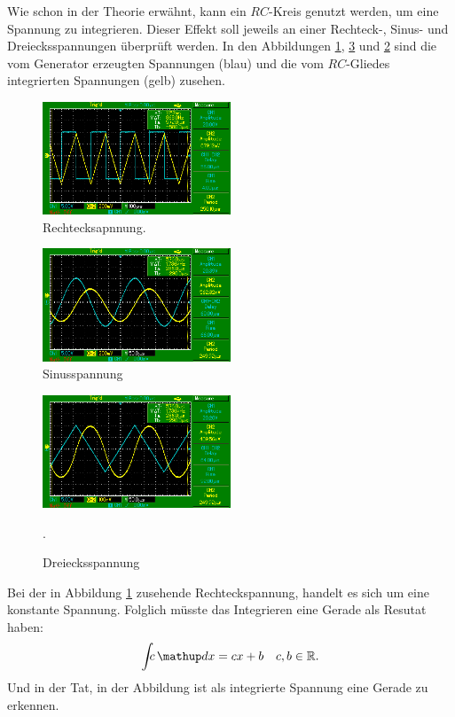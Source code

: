 Wie schon in der Theorie erwähnt, kann ein $RC$-Kreis genutzt werden, um eine
Spannung zu integrieren.
Dieser Effekt soll jeweils an einer Rechteck-, Sinus- und Dreiecksspannungen %
überprüft werden.
In den Abbildungen \ref{fig:rechteck}, \ref{fig:dreieck} und \ref{fig:sinus} sind die vom
Generator erzeugten Spannungen (blau) und die vom $RC$-Gliedes integrierten Spannungen
(gelb) zusehen. %
\FloatBarrier
\begin{figure}
  \centering
  \includegraphics[width=0.5\textwidth]{pics/teild_rechteckspannung.png}
  \caption{Rechtecksapnnung.}
  \label{fig:rechteck}
\end{figure}
\begin{figure}
  \centering
  \includegraphics[width=0.5\textwidth]{pics/bildd_sinus.png}
  \caption{Sinusspannung}
  \label{fig:sinus}
\end{figure}
\begin{figure}
  \centering
  \includegraphics[width=0.5\textwidth]{pics/teild_dreieck.png}
  \caption{Dreiecksspannung}.
  \label{fig:dreieck}
\end{figure}
\FloatBarrier

Bei der in Abbildung \ref{fig:rechteck} zusehende Rechteckspannung, %
handelt es sich um eine konstante Spannung. Folglich müsste das Integrieren
eine Gerade als Resutat haben: %
\begin{equation*}
   \int\!\!\!c \dv{x}= cx+b \quad c,b\in\mathbb{R}.
\end{equation*}
Und in der Tat, in der Abbildung ist als integrierte Spannung eine Gerade zu erkennen. %

